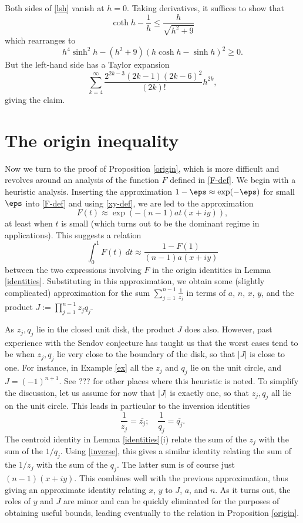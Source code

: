 \documentclass[12pt]{article}
\begin{document}
Both sides of \eqref{lsh} vanish at $h=0$.  Taking derivatives, it suffices to show that
$$ \coth h - \frac{1}{h} \leq \frac{h}{\sqrt{h^2+9}}$$
which rearranges to
$$ h^4 \sinh^2 h - (h^2+9) (h \cosh h - \sinh h)^2 \geq 0.$$
But the left-hand side has a Taylor expansion
$$ \sum_{k=4}^\infty \frac{2^{2k-3} (2k-1) (2k-6)^2}{(2k)!} h^{2k},$$
giving the claim.



\section{The origin inequality}

Now we turn to the proof of Proposition \ref{origin}, which is more difficult and revolves around an analysis of the function $F$ defined in \eqref{F-def}.  We begin with a heuristic analysis.  Inserting the approximation $1 - \eps \approx \exp(-\eps)$ for small $\eps$ into \eqref{F-def} and using \eqref{xy-def}, we are led to the approximation
\begin{equation}\label{ft}
 F(t) \approx \exp( - (n-1) a t (x+iy) ),
\end{equation}
at least when $t$ is small (which turns out to be the dominant regime in applications).  This suggests a relation
\begin{equation}\label{1fq}
 \int_0^1 F(t)\ dt \approx \frac{1 - F(1)}{(n-1) a (x+iy)}
\end{equation}
between the two expressions involving $F$ in the origin identities in Lemma \ref{identities}.  Substituting in this approximation, we obtain some (slightly complicated) approximation for the sum $\sum_{j=1}^{n-1} \frac{1}{z_j}$ in terms of $a$, $n$, $x$, $y$, and the product $J := \prod_{j=1}^{n-1} z_j q_j$.

As $z_j, q_j$ lie in the closed unit disk, the product $J$ does also.  However, past experience with the Sendov conjecture has taught us that the worst cases tend to be when $z_j, q_j$ lie very close to the boundary of the disk, so that $|J|$ is close to one.  For instance, in Example \ref{ex} all the $z_j$ and $q_j$ lie on the unit circle, and $J = (-1)^{n+1}$.  See ??? for other places where this heuristic is noted.  To simplify the discussion, let us assume for now that $|J|$ is exactly one, so that $z_j, q_j$ all lie on the unit circle.  This leads in particular to the inversion identities
\begin{equation}\label{inverse}
     \frac{1}{z_j} = \overline{z_j}; \quad \frac{1}{q_j} = \overline{q_j}.
\end{equation}
The centroid identity in Lemma \ref{identities}(i) relate the sum of the $z_j$ with the sum of the $1/q_j$.  Using \eqref{inverse}, this gives a similar identity relating the sum of the $1/z_j$ with the sum of the $q_j$.  The latter sum is of course just $(n-1) (x+iy)$.  This combines well with the previous approximation, thus giving an approximate identity relating $x$, $y$ to $J$, $a$, and $n$.  As it turns out, the roles of $y$ and $J$ are minor and can be quickly eliminated for the purposes of obtaining useful bounds, leading eventually to the relation in Proposition \ref{origin}.
\end{document}
